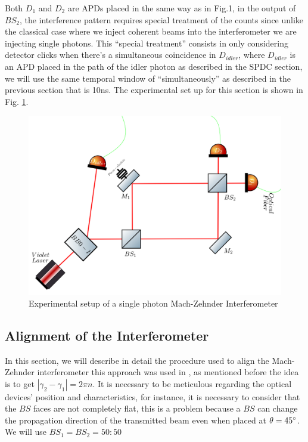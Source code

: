 \documentclass{book}
\begin{document}
Both $D_{1}$ and $D_{2}$ are APDs placed in the same way as in Fig.1, in the output of  $BS_{2}$, the interference pattern requires special treatment of the counts since unlike the classical case where we inject coherent beams into the interferometer we are injecting single photons. This ``special treatment'' consists in only considering detector clicks when there's a simultaneous coincidence in $D_{idler}$, where $D_{idler}$ is an APD placed in the path of the idler photon as described in the SPDC section, we will use the same temporal window of ``simultaneously'' as described in the previous section that is 10ns. The experimental set up for this section is shown in Fig. \ref{newsingle}.


\begin{figure}[!htb]
\centering
\includegraphics[width=\linewidth]{images/machzehnder_single.png}
\caption{Experimental setup of a single photon Mach-Zehnder Interferometer}
\label{newsingle}
\end{figure}

\subsection{Alignment of the Interferometer}

In this section, we will describe in detail the procedure used to align the Mach-Zehnder interferometer this approach was used in \cite{zuri}, as mentioned before the idea is to get $|\gamma_{2}-\gamma_{1}|=2\pi n$. It is necessary to be meticulous regarding the optical devices' position and characteristics, for instance, it is necessary to consider that the $BS$ faces are not completely flat, this is a problem because a $BS$ can change the propagation direction of the transmitted beam even when placed at $\theta=45\degree$. We will use $BS_{1}=BS_{2}=50:50$
\end{document}
